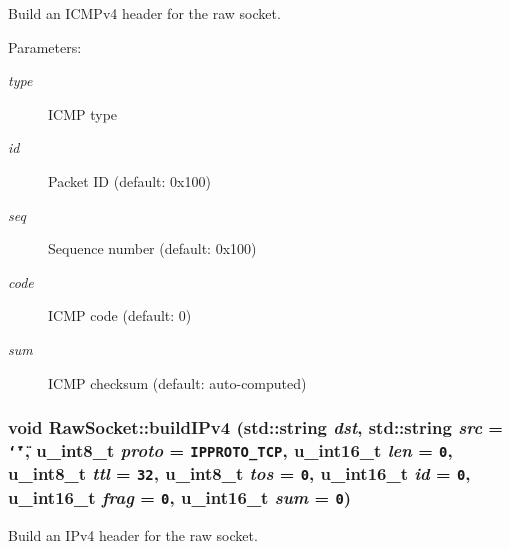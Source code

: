 Build an ICMPv4 header for the raw socket. 

\begin{Desc}
\item[Parameters:]
\begin{description}
\item[{\em type}]ICMP type \item[{\em id}]Packet ID (default: 0x100) \item[{\em seq}]Sequence number (default: 0x100) \item[{\em code}]ICMP code (default: 0) \item[{\em sum}]ICMP checksum (default: auto-computed) \end{description}
\end{Desc}
\hypertarget{classRawSocket_9536928bd82c99ef2b615b0ffcb87f21}{
\subsubsection[{buildIPv4}]{\setlength{\rightskip}{0pt plus 5cm}void RawSocket::buildIPv4 (std::string {\em dst}, \/  std::string {\em src} = {\tt \char`\"{}\char`\"{}}, \/  u\_\-int8\_\-t {\em proto} = {\tt IPPROTO\_\-TCP}, \/  u\_\-int16\_\-t {\em len} = {\tt 0}, \/  u\_\-int8\_\-t {\em ttl} = {\tt 32}, \/  u\_\-int8\_\-t {\em tos} = {\tt 0}, \/  u\_\-int16\_\-t {\em id} = {\tt 0}, \/  u\_\-int16\_\-t {\em frag} = {\tt 0}, \/  u\_\-int16\_\-t {\em sum} = {\tt 0})}}
\label{classRawSocket_9536928bd82c99ef2b615b0ffcb87f21}


Build an IPv4 header for the raw socket. 

